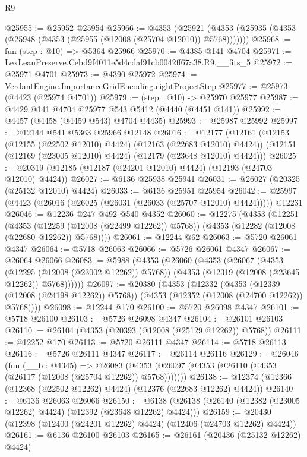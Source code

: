 \begin{lexlean}{R9}
\begin{coremodule}
@25955 := @25952 @25954
@25966 := @4353
    (@25921 (@4353 (@25935 (@4353 (@25948 (@4353 (@25955 (@12008 (@25704 @12010)) @5768)))))))
@25968 := fun (step : @10) => @5364 @25966
@25970 := @4385 @141 @4704
@25971 := LexLeanPreserve.Cebd9f4011e5d4cdaf91cb0042ff67a38.R9.__fits_5
@25972 := @25971 @4701
@25973 := @4390 @25972
@25974 := VerdantEngine.ImportanceGridEncoding.eightProjectStep
@25977 := @25973 (@4423 (@25974 @4701))
@25979 := (step : @10) -> @25970 @25977
@25987 := @4429 @141 @4704 @25977 @543 @5412 (@4440 (@4451 @141))
@25992 := @4457 (@4458 (@4459 @543) @4704 @4435)
@25993 := @25987 @25992
@25997 := @12144 @541 @5363 @25966 @12148
@26016 := @12177
    (@12161
      (@12153 (@12155 (@22502 @12010) @4424) (@12163 (@22683 @12010) @4424))
      (@12151 (@12169 (@23005 @12010) @4424) (@12179 (@23648 @12010) @4424)))
@26025 := @20319 (@12185 (@12187 (@24201 @12010) @4424) (@12193 (@24703 @12010) @4424))
@26027 := @6136 @25938 @25941
@26031 := @26027 (@20325 (@25132 @12010) @4424)
@26033 := @6136 @25951 @25954
@26042 := @25997 (@4423 (@26016 (@26025 (@26031 (@26033 (@25707 @12010) @4424))))) @12231
@26046 := @12236 @247 @492 @540 @4352
@26060 := @12275
    (@4353
      (@12251
        (@4353 (@12259 (@12008 (@22499 @12262)) @5768))
        (@4353 (@12282 (@12008 (@22680 @12262)) @5768))))
@26061 := @12244 @62
@26063 := @5720 @26061 @4347
@26064 := @5718 @26063
@26066 := @5726 @26061 @4347
@26067 := @26064 @26066
@26083 := @5988
    (@4353
      (@26060
        (@4353
          (@26067
            (@4353 (@12295 (@12008 (@23002 @12262)) @5768))
            (@4353 (@12319 (@12008 (@23645 @12262)) @5768))))))
@26097 := @20380
    (@4353
      (@12332
        (@4353 (@12339 (@12008 (@24198 @12262)) @5768))
        (@4353 (@12352 (@12008 (@24700 @12262)) @5768))))
@26098 := @12244 @170
@26100 := @5720 @26098 @4347
@26101 := @5718 @26100
@26103 := @5726 @26098 @4347
@26104 := @26101 @26103
@26110 := @26104 (@4353 (@20393 (@12008 (@25129 @12262)) @5768))
@26111 := @12252 @170
@26113 := @5720 @26111 @4347
@26114 := @5718 @26113
@26116 := @5726 @26111 @4347
@26117 := @26114 @26116
@26129 := @26046
    (fun (__b : @4345) =>
    @26083 (@4353 (@26097 (@4353 (@26110 (@4353 (@26117 (@12008 (@25704 @12262)) @5768)))))))
@26138 := @12374 (@12366 (@12368 (@22502 @12262) @4424) (@12376 (@22683 @12262) @4424))
@26140 := @6136 @26063 @26066
@26150 := @6138 (@26138 (@26140 (@12382 (@23005 @12262) @4424) (@12392 (@23648 @12262) @4424)))
@26159 := @20430 (@12398 (@12400 (@24201 @12262) @4424) (@12406 (@24703 @12262) @4424))
@26161 := @6136 @26100 @26103
@26165 := @26161 (@20436 (@25132 @12262) @4424)

\end{coremodule}
\end{lexlean}
